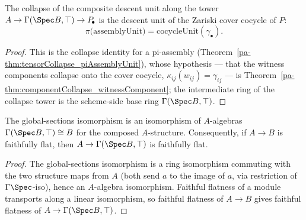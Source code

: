 \begin{theorem}
  \label{pa-thm:tensorCollapse_assemblyUnit}
  \leanok

  The collapse of the composite descent unit along the tower \(A \to \Gamma(\Spec B, \top) \to
  P_{\!\bullet}\) is the descent unit of the Zariski cover cocycle of \(P\):
  \[
    \pi\bigl(\mathrm{assemblyUnit}\bigr) = \mathrm{cocycleUnit}(\gamma_{\bullet}) .
  \]
\end{theorem}
\begin{proof}
  \leanok
  This is the collapse identity for a pi-assembly
  (Theorem~\ref{pa-thm:tensorCollapse_piAssemblyUnit}), whose hypothesis — that the witness
  components collapse onto the cover cocycle, \(\kappa_{ij}(w_{ij}) = \gamma_{ij}\) — is
  Theorem~\ref{pa-thm:componentCollapse_witnessComponent}; the intermediate ring of the collapse
  tower is the scheme-side base ring \(\Gamma(\Spec B, \top)\).
\end{proof}

\begin{lemma}
  \label{pa-lem:faithfullyFlat_sectionsTop}
  \leanok

  The global-sections isomorphism is an isomorphism of \(A\)-algebras \(\Gamma(\Spec B, \top)
  \cong B\) for the composed \(A\)-structure. Consequently, if \(A \to B\) is faithfully flat,
  then \(A \to \Gamma(\Spec B, \top)\) is faithfully flat.
\end{lemma}
\begin{proof}
  \leanok
  The global-sections isomorphism is a ring isomorphism commuting with the two structure maps
  from \(A\) (both send \(a\) to the image of \(a\), via restriction of \(\Gamma\Spec\)-iso),
  hence an \(A\)-algebra isomorphism. Faithful flatness of a module transports along a linear
  isomorphism, so faithful flatness of \(A \to B\) gives faithful flatness of \(A \to
  \Gamma(\Spec B, \top)\).
\end{proof}

